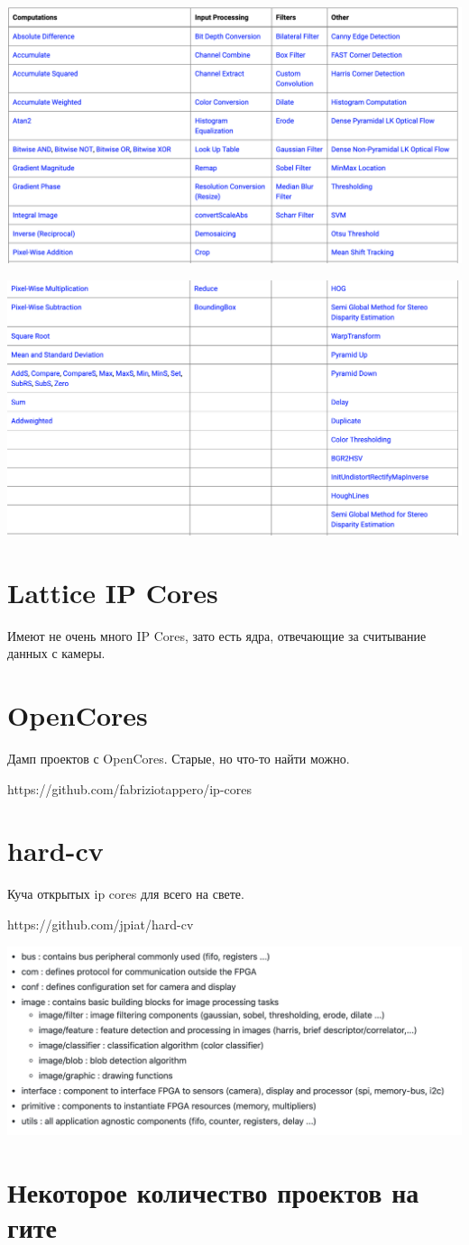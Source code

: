 \documentclass[12pt]{article}
\begin{document}
\includegraphics[scale=0.2]{../img/xfopencv2.png}

\includegraphics[scale=0.2]{../img/xfopencv1.png}


\section{Lattice IP Cores}
Имеют не очень много IP Cores, зато есть ядра, отвечающие за 
считывание данных с камеры.


\section{OpenCores}

Дамп проектов с OpenCores. Старые, но что-то найти можно.

https://github.com/fabriziotappero/ip-cores


\section{hard-cv}
Куча открытых ip cores для всего на свете.

https://github.com/jpiat/hard-cv


\includegraphics*[scale=.25]{../img/hardcv.png}


\section{Некоторое количество проектов на гите}
\end{document}

